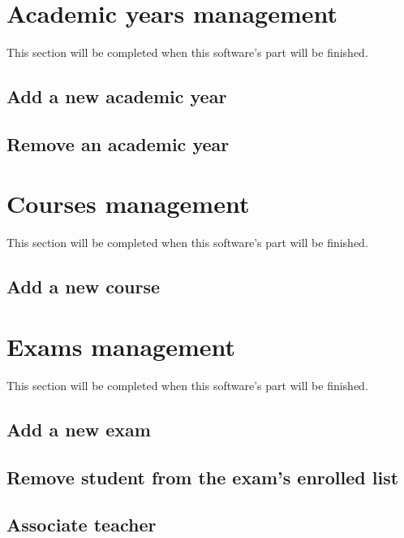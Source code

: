 \documentclass[ManualeUtente]{subfiles}
\begin{document}
\section{Academic years management}
This section will be completed when this software's part will be finished.
\subsection{Add a new academic year}
\subsection{Remove an academic year}

\section{Courses management}
This section will be completed when this software's part will be finished.
\subsection{Add a new course}

\section{Exams management}
This section will be completed when this software's part will be finished.
\subsection{Add a new exam}
\subsection{Remove student from the exam's enrolled list}
\subsection{Associate teacher}
\end{document}
